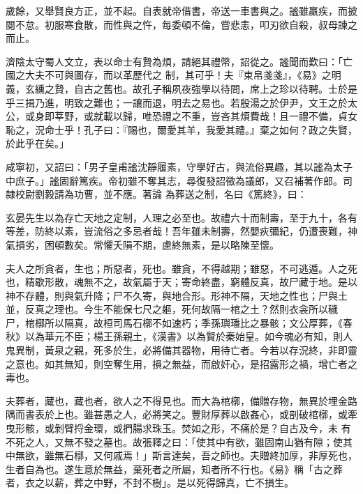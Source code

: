 \begin{pinyinscope}
 歲餘，又舉賢良方正，並不起。自表就帝借書，帝送一車書與之。謐雖羸疾，而披閱不怠。初服寒食散，而性與之忤，每委頓不倫，嘗悲恚，叩刃欲自殺，叔母諫之而止。



 濟陰太守蜀人文立，表以命士有贄為煩，請絕其禮幣，詔從之。謐聞而歎曰：「亡國之大夫不可與圖存，而以革歷代之
 制，其可乎！夫『束帛戔戔』，《易》之明義，玄纁之贄，自古之舊也。故孔子稱夙夜強學以待問，席上之珍以待聘。士於是乎三揖乃進，明致之難也；一讓而退，明去之易也。若殷湯之於伊尹，文王之於太公，或身即莘野，或就載以歸，唯恐禮之不重，豈吝其煩費哉！且一禮不備，貞女恥之，況命士乎！孔子曰：『賜也，爾愛其羊，我愛其禮。』棄之如何？政之失賢，於此乎在矣。」



 咸寧初，又詔曰：「男子皇甫謐沈靜履素，守學好古，與流俗異趣，其以謐為太子中庶子。」謐固辭篤疾。帝初雖不奪其志，尋復發詔徵為議郎，又召補著作郎。司隸校尉劉毅請為功曹，並不應。著論
 為葬送之制，名曰《篤終》，曰：



 玄晏先生以為存亡天地之定制，人理之必至也。故禮六十而制壽，至于九十，各有等差，防終以素，豈流俗之多忌者哉！吾年雖未制壽，然嬰疢彌紀，仍遭喪難，神氣損劣，困頓數矣。常懼夭隕不期，慮終無素，是以略陳至懷。



 夫人之所貪者，生也；所惡者，死也。雖貪，不得越期；雖惡，不可逃遁。人之死也，精歇形散，魂無不之，故氣屬于天；寄命終盡，窮體反真，故尸藏于地。是以神不存體，則與氣升降；尸不久寄，與地合形。形神不隔，天地之性也；尸與土並，反真之理也。今生不能保七尺之軀，死何故隔一棺之土？然則衣衾所以穢
 尸，棺槨所以隔真，故桓司馬石槨不如速朽；季孫璵璠比之暴骸；文公厚葬，《春秋》以為華元不臣；楊王孫親土，《漢書》以為賢於秦始皇。如今魂必有知，則人鬼異制，黃泉之親，死多於生，必將備其器物，用待亡者。今若以存況終，非即靈之意也。如其無知，則空奪生用，損之無益，而啟奸心，是招露形之禍，增亡者之毒也。



 夫葬者，藏也，藏也者，欲人之不得見也。而大為棺槨，備贈存物，無異於埋金路隅而書表於上也。雖甚愚之人，必將笑之。豐財厚葬以啟姦心，或剖破棺槨，或牽曳形骸，或剝臂捋金環，或捫腸求珠玉。焚如之形，不痛於是？自古及今，未
 有不死之人，又無不發之墓也。故張釋之曰：「使其中有欲，雖固南山猶有隙；使其中無欲，雖無石槨，又何戚焉！」斯言達矣，吾之師也。夫贈終加厚，非厚死也，生者自為也。遂生意於無益，棄死者之所屬，知者所不行也。《易》稱「古之葬者，衣之以薪，葬之中野，不封不樹」。是以死得歸真，亡不損生。




\end{pinyinscope}
